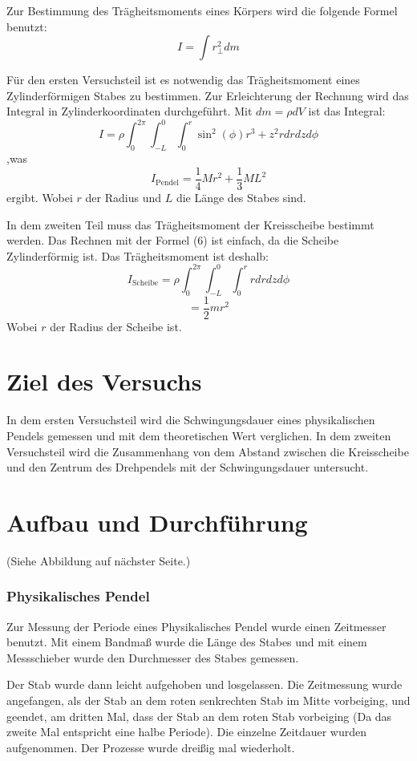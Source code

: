 \documentclass[11pt,a4paper]{article} %
\begin{document}
Zur Bestimmung des Trägheitsmoments eines Körpers wird die folgende Formel benutzt:
\begin{equation}
I = \int r_\perp^2 dm
\end{equation}

Für den ersten Versuchsteil ist es notwendig das Trägheitsmoment eines Zylinderförmigen Stabes zu bestimmen. Zur Erleichterung der Rechnung wird das Integral in Zylinderkoordinaten durchgeführt. Mit $dm = \rho dV$ ist das Integral:
$$I = \rho \int_{0}^{2\pi} \int_{-L}^{0} \int_{0}^{r} \sin^2(\phi)r^3 + z^2r dr dz d\phi$$ 
,was 
\begin{equation}
I_\textrm{Pendel} = \frac{1}{4}Mr^2 +\frac{1}{3}ML^2
\end{equation}
ergibt. Wobei $r$ der Radius und $L$ die Länge des Stabes sind. 

In dem zweiten Teil muss das Trägheitsmoment der Kreisscheibe bestimmt werden. Das Rechnen mit der Formel (6) ist einfach, da die Scheibe Zylinderförmig ist. Das Trägheitsmoment ist deshalb:
$$ I_\textrm{Scheibe} = \rho \int_{0}^{2\pi} \int_{-L}^{0} \int_{0}^{r} r dr dz d\phi $$
\begin{equation}
= \frac{1}{2}mr^2
\end{equation}
Wobei $r$ der Radius der Scheibe ist. 
\section{Ziel des Versuchs}
In dem ersten Versuchsteil wird die Schwingungsdauer eines physikalischen Pendels gemessen und mit dem theoretischen Wert verglichen. In dem zweiten Versuchsteil wird die Zusammenhang von dem Abstand zwischen die Kreisscheibe und den Zentrum des Drehpendels mit der Schwingungsdauer untersucht. 

\section{Aufbau und Durchführung}
(Siehe Abbildung auf nächster Seite.)
\subsubsection{Physikalisches Pendel}
Zur Messung der Periode eines Physikalisches Pendel wurde einen Zeitmesser benutzt. Mit einem Bandmaß wurde die Länge des Stabes und mit einem Messschieber wurde den Durchmesser des Stabes gemessen. 

Der Stab wurde dann leicht aufgehoben und losgelassen. Die Zeitmessung wurde angefangen, als der Stab an dem roten senkrechten Stab im Mitte vorbeiging, und geendet, am dritten Mal, dass der Stab an dem roten Stab vorbeiging (Da das zweite Mal entspricht eine halbe Periode). Die einzelne Zeitdauer wurden aufgenommen. Der Prozesse wurde dreißig mal wiederholt. 
\end{document}
